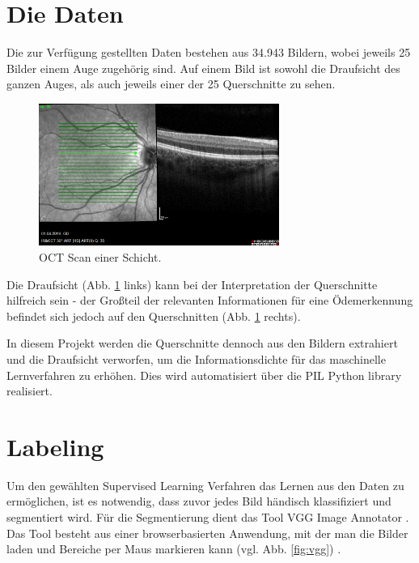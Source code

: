 \section{Die Daten}

Die zur Verfügung gestellten Daten bestehen aus 34.943 Bildern, wobei jeweils 25 Bilder einem Auge zugehörig sind. Auf einem Bild ist sowohl die Draufsicht des ganzen Auges, als auch jeweils einer der 25 Querschnitte zu sehen.

\begin{figure}[H]
\centering
\includegraphics[width=0.7\textwidth]{./pic/Datenvorverarbeitung/OCT-Scan.png}
\caption{\label{fig:octscan}OCT Scan einer Schicht.}
\end{figure}

Die Draufsicht (Abb. \ref{fig:octscan} links) kann bei der Interpretation der Querschnitte hilfreich sein - der Großteil der relevanten Informationen für eine Ödemerkennung befindet sich jedoch auf den Querschnitten (Abb. \ref{fig:octscan} rechts).

In diesem Projekt werden die Querschnitte dennoch aus den Bildern extrahiert und die Draufsicht verworfen, um die Informationsdichte für das maschinelle Lernverfahren zu erhöhen. Dies wird automatisiert über die PIL Python library realisiert.

\section{Labeling}

Um den gewählten Supervised Learning Verfahren das Lernen aus den Daten zu ermöglichen, ist es notwendig, dass zuvor jedes Bild händisch klassifiziert und segmentiert wird. Für die Segmentierung dient das Tool VGG Image Annotator \cite{24}. Das Tool besteht aus einer browserbasierten Anwendung, mit der man die Bilder laden und Bereiche per Maus markieren kann (vgl. Abb. \ref{fig:vgg}) .

